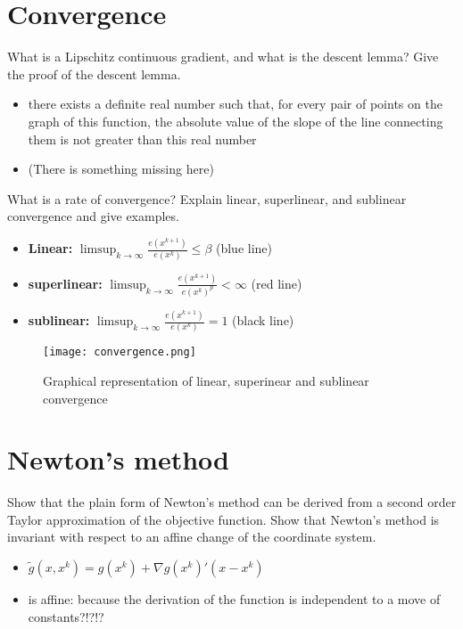 \documentclass{article}
\begin{document}
\section{Convergence}

\begin{question}
  What is a Lipschitz continuous gradient, and what is the descent lemma?  Give the proof of the
  descent lemma.
\end{question}
\begin{itemize}

\item there exists a definite real number such that, for every pair of points on the graph of this
  function, the absolute value of the slope of the line connecting them is not greater than this
  real number
  
\item (There is something missing here)
  
\end{itemize}

\begin{question}
  What is a rate of convergence? Explain linear, superlinear, and sublinear convergence and give
  examples.
\end{question}
\begin{itemize}
\item \textbf{Linear:} $\limsup_{k \rightarrow \infty} \frac{e(x^{k+1})}{e(x^k)}\leq \beta$ (blue line)
\item \textbf{superlinear:} $\limsup_{k \rightarrow \infty} \frac{e(x^{k+1})}{e(x^k)^p} < \infty$ (red line)
\item \textbf{sublinear:} $\limsup_{k \rightarrow \infty} \frac{e(x^{k+1})}{e(x^k)} = 1$ (black line)
\end{itemize}

\begin{figure}[H]
  \texttt{[image: convergence.png]}
  \caption{Graphical representation of linear, superinear and sublinear
    convergence \label{fig:desc_dir}}
\end{figure}

\section{Newton's method}

\begin{question}
  Show that the plain form of Newton’s method can be derived from a second order Taylor
  approximation of the objective function. Show that Newton’s method is invariant with respect to an
  affine change of the coordinate system.
\end{question}
\begin{itemize}
\item $\tilde{g}(x, x^k) = g(x^k) + \nabla g(x^k)'(x - x^k)$
\item is affine: because the derivation of the function is independent to a move of constants?!?!?
\end{itemize}
\end{document}
